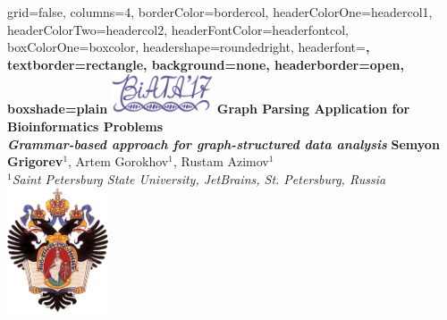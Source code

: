 \documentclass[a0paper,portrait]{baposter}
\begin{document}
\begin{poster}{
grid=false,
columns=4,
borderColor=bordercol, %
headerColorOne=headercol1, %
headerColorTwo=headercol2, %
headerFontColor=headerfontcol, %
boxColorOne=boxcolor, %
headershape=roundedright, %
headerfont=\Large\sf\bf, %
textborder=rectangle,
background=none,
headerborder=open, %
boxshade=plain
}
{\includegraphics[width=3cm]{BiAtA2017.png}}
%
%
{ \bf  \huge {Graph Parsing Application for Bioinformatics Problems} \\  \Large \it Grammar-based approach for graph-structured data analysis} %
{\vspace{0.3em} \smaller \textbf{Semyon Grigorev$^1$}, Artem Gorokhov$^1$, Rustam Azimov$^1$ \\  %
\smaller \it $^1${Saint Petersburg State University, JetBrains, St. Petersburg, Russia } \\ %
}
{\includegraphics[width=3cm]{SPbGU_Logo.png}} %


\end{poster}
\end{document}
